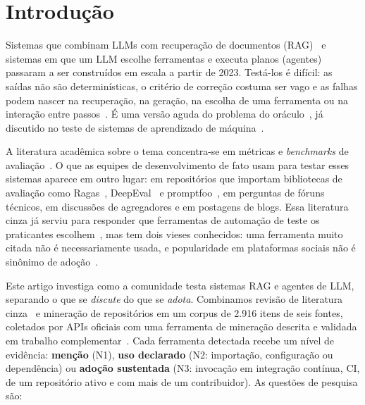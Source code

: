 \documentclass[sigconf]{acmart}
\begin{document}

\frenchspacing
\maketitle

\section{Introdução}
\label{sec:introducao}

Sistemas que combinam LLMs com recuperação de documentos (RAG)~\cite{lewis2020rag,gao2023ragsurvey} e sistemas em que um LLM escolhe ferramentas e executa planos (agentes) passaram a ser construídos em escala a partir de 2023. Testá-los é difícil: as saídas não são determinísticas, o critério de correção costuma ser vago e as falhas podem nascer na recuperação, na geração, na escolha de uma ferramenta ou na interação entre passos~\cite{barnett2024seven,cemri2025multiagent}. É uma versão aguda do problema do oráculo~\cite{barr2015oracle}, já discutido no teste de sistemas de aprendizado de máquina~\cite{zhang2022mltesting}.

A literatura acadêmica sobre o tema concentra-se em métricas e \textit{benchmarks} de avaliação~\cite{chang2024survey,yu2024ragsurvey,yehudai2025agents}. O que as equipes de desenvolvimento de fato usam para testar esses sistemas aparece em outro lugar: em repositórios que importam bibliotecas de avaliação como Ragas~\cite{es2024ragas}, DeepEval~\cite{deepeval} e promptfoo~\cite{promptfoo}, em perguntas de fóruns técnicos, em discussões de agregadores e em postagens de blogs. Essa literatura cinza já serviu para responder que ferramentas de automação de teste os praticantes escolhem~\cite{raulamo2017choosing}, mas tem dois vieses conhecidos: uma ferramenta muito citada não é necessariamente usada, e popularidade em plataformas sociais não é sinônimo de adoção~\cite{borges2018star,kalliamvakou2014promises}.

Este artigo investiga como a comunidade testa sistemas RAG e agentes de LLM, separando o que se \emph{discute} do que se \emph{adota}. Combinamos revisão de literatura cinza~\cite{garousi2019guidelines} e mineração de repositórios em um corpus de 2.916 itens de seis fontes, coletados por APIs oficiais com uma ferramenta de mineração descrita e validada em trabalho complementar~\cite{msrkit2027}. Cada ferramenta detectada recebe um nível de evidência: \textbf{menção} (N1), \textbf{uso declarado} (N2: importação, configuração ou dependência) ou \textbf{adoção sustentada} (N3: invocação em integração contínua, CI, de um repositório ativo e com mais de um contribuidor). As questões de pesquisa são:
\end{document}
